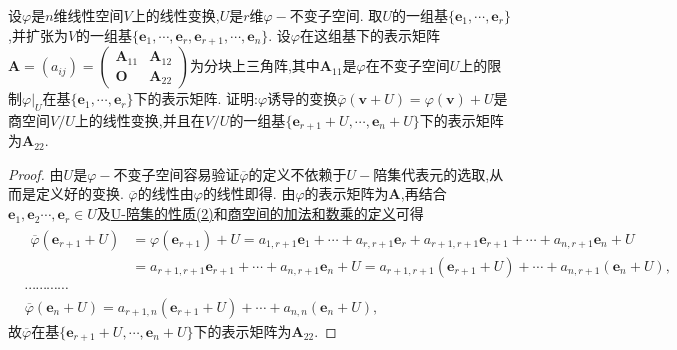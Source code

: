 \documentclass[../../main.tex]{subfiles}%
\begin{document}
\begin{proposition}\label{proposition:商空间下的线性变换对应表示矩阵}
设\(\varphi\)是\(n\)维线性空间\(V\)上的线性变换,\(U\)是\(r\)维\(\varphi -\)不变子空间. 取\(U\)的一组基\(\{\boldsymbol{e}_1,\cdots,\boldsymbol{e}_r\}\),并扩张为\(V\)的一组基\(\{\boldsymbol{e}_1,\cdots,\boldsymbol{e}_r,\boldsymbol{e}_{r + 1},\cdots,\boldsymbol{e}_n\}\). 设\(\varphi\)在这组基下的表示矩阵\(\boldsymbol{A}=(a_{ij})=\begin{pmatrix}\boldsymbol{A}_{11}&\boldsymbol{A}_{12}\\ \boldsymbol{O}&\boldsymbol{A}_{22}\end{pmatrix}\)为分块上三角阵,其中\(\boldsymbol{A}_{11}\)是\(\varphi\)在不变子空间\(U\)上的限制\(\varphi|_U\)在基\(\{\boldsymbol{e}_1,\cdots,\boldsymbol{e}_r\}\)下的表示矩阵. 证明:\(\varphi\)诱导的变换\(\overline{\varphi}(\boldsymbol{v}+U)=\varphi(\boldsymbol{v})+U\)是商空间\(V/U\)上的线性变换,并且在\(V/U\)的一组基\(\{\boldsymbol{e}_{r + 1}+U,\cdots,\boldsymbol{e}_n+U\}\)下的表示矩阵为\(\boldsymbol{A}_{22}\).
\end{proposition}
\begin{proof}

由\(U\)是\(\varphi -\)不变子空间容易验证\(\overline{\varphi}\)的定义不依赖于\(U -\)陪集代表元的选取,从而是定义好的变换. \(\overline{\varphi}\)的线性由\(\varphi\)的线性即得. 由\(\varphi\)的表示矩阵为\(\boldsymbol{A}\),再结合$\boldsymbol{e}_1,\boldsymbol{e}_2\cdots ,\boldsymbol{e}_r\in U$及\hyperref[proposition:U-陪集的性质]{U-陪集的性质(2)}和\hyperref[definition:U-陪集与商空间]{商空间的加法和数乘的定义}可得
\begin{align*}
&\begin{aligned}
\overline{\varphi }\left( \boldsymbol{e}_{r+1}+U \right) &=\varphi \left( \boldsymbol{e}_{r+1} \right) +U=a_{1,r+1}\boldsymbol{e}_1+\cdots +a_{r,r+1}\boldsymbol{e}_r+a_{r+1,r+1}\boldsymbol{e}_{r+1}+\cdots +a_{n,r+1}\boldsymbol{e}_n+U
\\
&=a_{r+1,r+1}\boldsymbol{e}_{r+1}+\cdots +a_{n,r+1}\boldsymbol{e}_n+U=a_{r+1,r+1}\left( \boldsymbol{e}_{r+1}+U \right) +\cdots +a_{n,r+1}\left( \boldsymbol{e}_n+U \right) ,
\end{aligned}
\\
&\cdots \cdots \cdots \cdots 
\\
&\overline{\varphi }(\boldsymbol{e}_n+U)=a_{r+1,n}(\boldsymbol{e}_{r+1}+U)+\cdots +a_{n,n}(\boldsymbol{e}_n+U),
\end{align*}
故\(\overline{\varphi}\)在基\(\{\boldsymbol{e}_{r + 1}+U,\cdots,\boldsymbol{e}_n+U\}\)下的表示矩阵为\(\boldsymbol{A}_{22}\). 

\end{proof}
\end{document}
